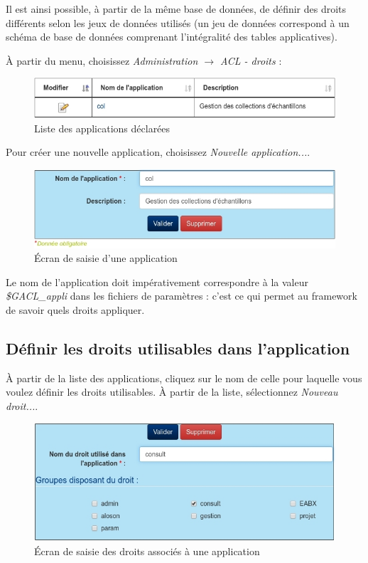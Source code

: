 Il est ainsi possible, à partir de la même base de données, de définir des droits différents selon les jeux de données utilisés (un jeu de données correspond à un schéma de base de données comprenant l'intégralité des tables applicatives).

À partir du menu, choisissez \textit{Administration $\rightarrow$ ACL - droits} :
\begin{figure}[H]
\includegraphics[width=\linewidth]{images/liste_appli}
\caption{Liste des applications déclarées}
\end{figure}

Pour créer une nouvelle application, choisissez \textit{Nouvelle application...}. 

\begin{figure}[H]
\includegraphics[width=\linewidth]{images/appli_change}
\caption{Écran de saisie d'une application}
\end{figure}

Le nom de l'application doit impérativement correspondre à la valeur \textit{\$GACL\_appli} dans les fichiers de paramètres : c'est ce qui permet au framework de savoir quels droits appliquer.

\subsection{Définir les droits utilisables dans l'application}

À partir de la liste des applications, cliquez sur le nom de celle pour laquelle vous voulez définir les droits utilisables. 
À partir de la liste, sélectionnez \textit{Nouveau droit...}.

\begin{figure}[H]
\includegraphics[width=\linewidth]{images/appli_droit}
\caption{Écran de saisie des droits associés à une application}
\end{figure}

